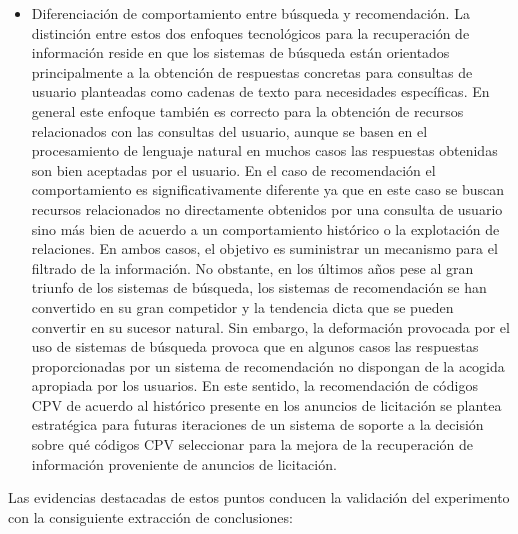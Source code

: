 \begin{itemize}
\item Diferenciación de comportamiento entre búsqueda y recomendación. La distinción 
entre estos dos enfoques tecnológicos para la recuperación de información reside 
en que los sistemas de búsqueda están orientados principalmente a la obtención 
de respuestas concretas para consultas de usuario planteadas como cadenas 
de texto para necesidades específicas. En general este enfoque también es correcto 
para la obtención de recursos relacionados con las consultas del usuario, aunque 
se basen en el procesamiento de lenguaje natural en muchos casos las respuestas 
obtenidas son bien aceptadas por el usuario. En el caso de recomendación 
el comportamiento es significativamente diferente ya que en este caso se buscan 
recursos relacionados no directamente obtenidos por una consulta de usuario sino 
más bien de acuerdo a un comportamiento histórico o la explotación de relaciones. En ambos casos, 
el objetivo es suministrar un mecanismo para el filtrado de la información. No obstante,
en los últimos años pese al gran triunfo de los sistemas de búsqueda, los sistemas 
de recomendación se han convertido en su gran competidor y la tendencia 
dicta que se pueden convertir en su sucesor natural. Sin embargo, la deformación provocada 
por el uso de sistemas de búsqueda provoca que en algunos casos las respuestas proporcionadas 
por un sistema de recomendación no dispongan de la acogida apropiada por los usuarios. En este sentido, 
la recomendación de códigos CPV de acuerdo al histórico presente en los anuncios de licitación 
se plantea estratégica para futuras iteraciones de un sistema de soporte a la decisión 
sobre qué códigos CPV seleccionar para la mejora de la recuperación de información 
proveniente de anuncios de licitación.
\end{itemize}

Las evidencias destacadas de estos puntos conducen la validación del experimento con la 
consiguiente extracción de conclusiones:

